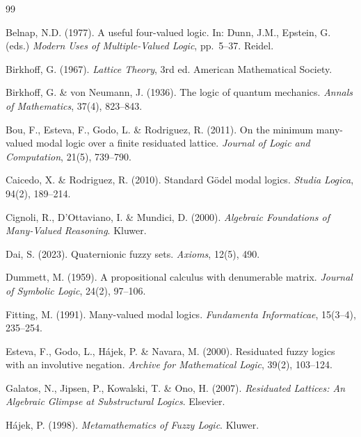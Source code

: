 \documentclass[11pt,a4paper]{article}
\begin{document}

\begin{thebibliography}{99}

Belnap, N.D. (1977).
A useful four-valued logic.
In: Dunn, J.M., Epstein, G. (eds.) \textit{Modern Uses of
Multiple-Valued Logic}, pp.~5--37. Reidel.

Birkhoff, G. (1967).
\textit{Lattice Theory}, 3rd ed.
American Mathematical Society.

Birkhoff, G. \& von Neumann, J. (1936).
The logic of quantum mechanics.
\textit{Annals of Mathematics}, 37(4), 823--843.

Bou, F., Esteva, F., Godo, L. \& Rodriguez, R. (2011).
On the minimum many-valued modal logic over a finite residuated
lattice.
\textit{Journal of Logic and Computation}, 21(5), 739--790.

Caicedo, X. \& Rodriguez, R. (2010).
Standard G\"odel modal logics.
\textit{Studia Logica}, 94(2), 189--214.

Cignoli, R., D'Ottaviano, I. \& Mundici, D. (2000).
\textit{Algebraic Foundations of Many-Valued Reasoning}.
Kluwer.

Dai, S. (2023).
Quaternionic fuzzy sets.
\textit{Axioms}, 12(5), 490.

Dummett, M. (1959).
A propositional calculus with denumerable matrix.
\textit{Journal of Symbolic Logic}, 24(2), 97--106.

Fitting, M. (1991).
Many-valued modal logics.
\textit{Fundamenta Informaticae}, 15(3--4), 235--254.

Esteva, F., Godo, L., H\'ajek, P. \& Navara, M. (2000).
Residuated fuzzy logics with an involutive negation.
\textit{Archive for Mathematical Logic}, 39(2), 103--124.

Galatos, N., Jipsen, P., Kowalski, T. \& Ono, H. (2007).
\textit{Residuated Lattices: An Algebraic Glimpse at Substructural
Logics}.
Elsevier.

H\'ajek, P. (1998).
\textit{Metamathematics of Fuzzy Logic}.
Kluwer.


\end{thebibliography}
\end{document}
